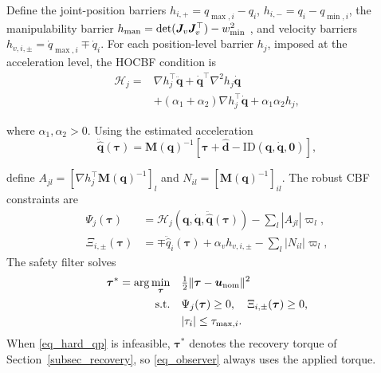 Define the joint-position barriers
$h_{i,+}=q_{\max,i}-q_i$,
$h_{i,-}=q_i-q_{\min,i}$, the manipulability
barrier
$h_{\rm man}=\det(\bm J_v\bm J_v^\top)-w_{\min}^2$
\cite{r6,r14}, and velocity barriers
$h_{v,i,\pm}=\dot q_{\max,i}\mp\dot q_i$.
For each position-level barrier $h_j$, imposed at the acceleration level, the HOCBF condition \cite{r8} is
\begin{equation}
\begin{aligned}
\mathcal H_j={}&
\nabla h_j^\top\ddot{\bm q}
+\dot{\bm q}^\top\nabla^2h_j\dot{\bm q}\\
&+(\alpha_1+\alpha_2)\nabla h_j^\top\dot{\bm q}
+\alpha_1\alpha_2h_j,
\end{aligned}
\label{eq_hocbf}
\end{equation}

where $\alpha_1,\alpha_2>0$.
Using the estimated acceleration
\begin{equation}
\ddot{\hat{\bm q}}(\bm\tau)
=\bm M(\bm q)^{-1}
[\bm\tau+\hat{\bm d}
-\mathrm{ID}(\bm q,\dot{\bm q},\bm0)],
\end{equation}

define
$A_{jl}=[\nabla h_j^\top\bm M(\bm q)^{-1}]_l$
and $N_{il}=[\bm M(\bm q)^{-1}]_{il}$.
The robust CBF constraints \cite{r9,r10,r11} are
\begin{equation}
\begin{aligned}
\Psi_j(\bm\tau)&=
\mathcal H_j(\bm q,\dot{\bm q},
\ddot{\hat{\bm q}}(\bm\tau))
-\sum_l|A_{jl}|\varpi_l,\\
\Xi_{i,\pm}(\bm\tau)&=
\mp\ddot{\hat q}_i(\bm\tau)
+\alpha_vh_{v,i,\pm}
-\sum_l|N_{il}|\varpi_l,
\end{aligned}
\label{eq_robust_cbf}
\end{equation}
The safety filter solves
\begin{equation}
\begin{aligned}
\bm\tau^*=\arg\min_{\bm\tau}\quad&
\tfrac12\|\bm\tau-\bm u_{\rm nom}\|^2\\
\mathrm{s.t.}\quad&
\Psi_j(\bm\tau)\ge0,\quad
\Xi_{i,\pm}(\bm\tau)\ge0,\\
&|\tau_i|\le\tau_{\max,i}.
\end{aligned}
\label{eq_hard_qp}
\end{equation}
When \eqref{eq_hard_qp} is infeasible, $\bm\tau^*$ denotes the recovery torque of Section~\ref{subsec_recovery}, so \eqref{eq_observer} always uses the applied torque.
